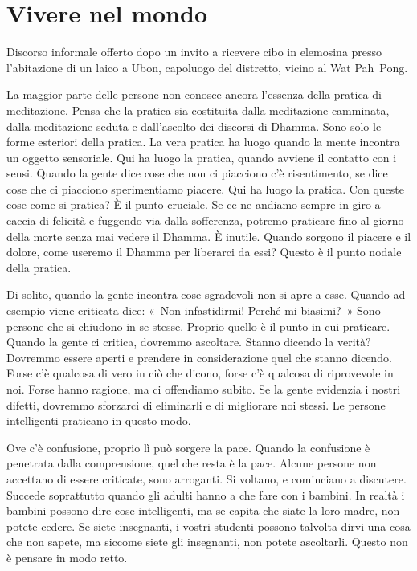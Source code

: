 \chapter{Vivere nel mondo}

\begin{openingQuote}
  \centering

  Discorso informale offerto dopo un invito a ricevere cibo in elemosina presso
  l'abitazione di un laico a Ubon, capoluogo del distretto, vicino al Wat
  Pah~Pong.
\end{openingQuote}

La maggior parte delle persone non conosce ancora l'essenza della
pratica di meditazione. Pensa che la pratica sia costituita dalla
meditazione camminata, dalla meditazione seduta e dall'ascolto dei
discorsi di Dhamma. Sono solo le forme esteriori della pratica. La vera
pratica ha luogo quando la mente incontra un oggetto sensoriale. Qui ha
luogo la pratica, quando avviene il contatto con i sensi. Quando la
gente dice cose che non ci piacciono c'è risentimento, se dice cose che
ci piacciono sperimentiamo piacere. Qui ha luogo la pratica. Con queste
cose come si pratica? È il punto cruciale. Se ce ne andiamo sempre in
giro a caccia di felicità e fuggendo via dalla sofferenza, potremo
praticare fino al giorno della morte senza mai vedere il Dhamma. È
inutile. Quando sorgono il piacere e il dolore, come useremo il Dhamma
per liberarci da essi? Questo è il punto nodale della pratica.

Di solito, quando la gente incontra cose sgradevoli non si apre a esse.
Quando ad esempio viene criticata dice: «~Non infastidirmi! Perché mi
biasimi?~» Sono persone che si chiudono in se stesse. Proprio quello è il
punto in cui praticare. Quando la gente ci critica, dovremmo ascoltare.
Stanno dicendo la verità? Dovremmo essere aperti e prendere in
considerazione quel che stanno dicendo. Forse c'è qualcosa di vero in
ciò che dicono, forse c'è qualcosa di riprovevole in noi. Forse hanno
ragione, ma ci offendiamo subito. Se la gente evidenzia i nostri
difetti, dovremmo sforzarci di eliminarli e di migliorare noi stessi. Le
persone intelligenti praticano in questo modo.

Ove c'è confusione, proprio lì può sorgere la pace. Quando la confusione
è penetrata dalla comprensione, quel che resta è la pace. Alcune persone
non accettano di essere criticate, sono arroganti. Si voltano, e
cominciano a discutere. Succede soprattutto quando gli adulti hanno a
che fare con i bambini. In realtà i bambini possono dire cose
intelligenti, ma se capita che siate la loro madre, non potete cedere.
Se siete insegnanti, i vostri studenti possono talvolta dirvi una cosa
che non sapete, ma siccome siete gli insegnanti, non potete ascoltarli.
Questo non è pensare in modo retto.

